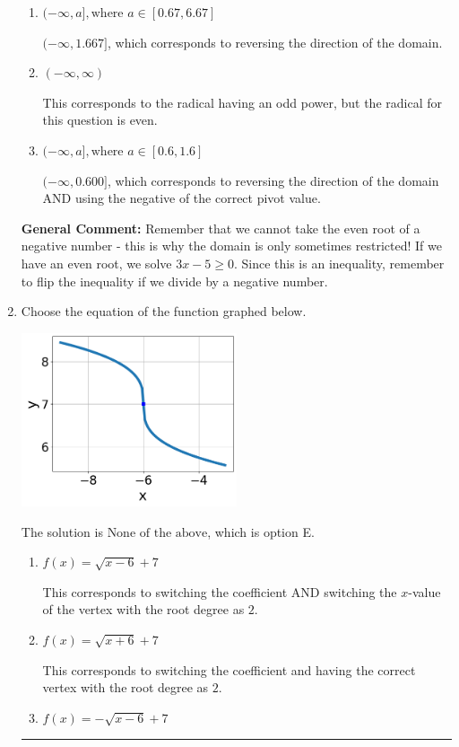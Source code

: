 \documentclass{extbook}[14pt]
\newcommand{\litem}[1]{\item #1

\rule{\textwidth}{0.4pt}}
\begin{document}
\begin{enumerate}
{\begin{enumerate}[label=\Alph*.]
* $[1.667, \infty)$, which is the correct option.
\item \( (-\infty, a], \text{where } a \in [0.67, 6.67] \)

 $(-\infty, 1.667]$, which corresponds to reversing the direction of the domain.
\item \( (-\infty, \infty) \)

This corresponds to the radical having an odd power, but the radical for this question is even.
\item \( (-\infty, a], \text{where } a \in [0.6, 1.6] \)

$(-\infty, 0.600]$, which corresponds to reversing the direction of the domain AND using the negative of the correct pivot value.
\end{enumerate}

\textbf{General Comment:} Remember that we cannot take the even root of a negative number - this is why the domain is only sometimes restricted! If we have an even root, we solve $3 x - 5 \geq 0$. Since this is an inequality, remember to flip the inequality if we divide by a negative number.
}
\litem{
Choose the equation of the function graphed below.

\begin{center}
    \includegraphics[width=0.5\textwidth]{../Figures/radicalGraphToEquationC.png}
\end{center}


The solution is \( \text{None of the above} \), which is option E.\begin{enumerate}[label=\Alph*.]
\item \( f(x) = \sqrt{x - 6} + 7 \)

This corresponds to switching the coefficient AND switching the $x$-value of the vertex with the root degree as $2$.
\item \( f(x) = \sqrt{x + 6} + 7 \)

This corresponds to switching the coefficient and having the correct vertex with the root degree as $2$.
\item \( f(x) = - \sqrt{x - 6} + 7 \)


\end{enumerate}}
\end{enumerate}
\end{document}
